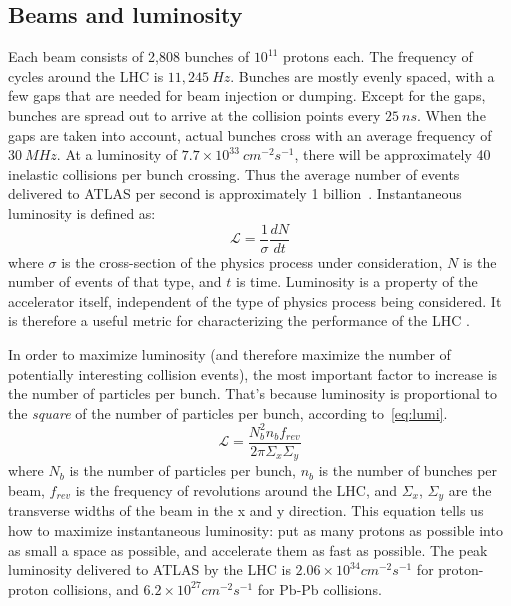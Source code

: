 \subsection{Beams and luminosity}\label{subsec:lhc_beam}

Each beam consists of 2,808 bunches of $10^{11}$ protons each.
The frequency of cycles around the LHC is $11,245~Hz$.
Bunches are mostly evenly spaced, with a few gaps that are needed for beam injection or dumping.
Except for the gaps, bunches are spread out to arrive at the collision points every $25~ns$.
When the gaps are taken into account, actual bunches cross with an average frequency of $30~MHz$.
At a luminosity of $7.7\times10^{33}~cm^{-2}s^{-1}$, there will be approximately 40 inelastic collisions per bunch crossing.
Thus the average number of events delivered to ATLAS per second is approximately 1 billion~\cite{lhc-guide-2017}.
Instantaneous luminosity is defined as:
\begin{equation}
\mathcal{L} = \frac{1}{\sigma}\frac{dN}{dt}
\end{equation}
where $\sigma$ is the cross-section of the physics process under consideration, $N$ is the number of events of that type, and $t$ is time.
Luminosity is a property of the accelerator itself, independent of the type of physics process being considered.
It is therefore a useful metric for characterizing the performance of the LHC .

In order to maximize luminosity (and therefore maximize the number of potentially interesting collision events), the most important factor to increase is the number of particles per bunch.
That's because luminosity is proportional to the \textit{square} of the number of particles per bunch, according to~\ref{eq:lumi}.
\begin{equation}\label{eq:lumi}
\mathcal{L} = \frac{N_b^2 n_b f_{rev}}{2\pi \Sigma_x \Sigma_y}
\end{equation}
where $N_b$ is the number of particles per bunch, $n_b$ is the number of bunches per beam, $f_{rev}$ is the frequency of revolutions around the LHC, and $\Sigma_x$, $\Sigma_y$ are the transverse widths of the beam in the x and y direction.
This equation tells us how to maximize instantaneous luminosity: put as many protons as possible into as small a space as possible, and accelerate them as fast as possible.
The peak luminosity delivered to ATLAS by the LHC is $2.06\times10^{34}cm^{-2}s^{-1}$ for proton-proton collisions, and $6.2\times10^{27}cm^{-2}s^{-1}$ for $\mathrm{Pb}$-$\mathrm{Pb}$ collisions.

